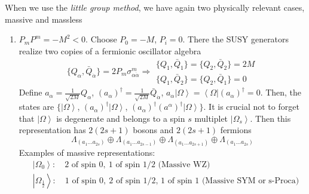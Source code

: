 \documentclass[a4paper,12pt]{article}
\numberwithin{equation}{section}
\numberwithin{exe}{section}
\newcommand{\Qb}{{\bar Q}}
\newcommand{\vac}{{\left|\Omega\right>}}
\renewcommand{\a}{{\alpha}}
\newcommand{\ad}{{\dot\alpha}}
\renewcommand{\L}{{\Lambda}}
\newcommand{\s}{{\sigma}}
\begin{document}
When we use the {\it little group method}, we have again two physically relevant cases, massive and massless
	\begin{enumerate}
	\item $P_m P^m = -M^2 <0$. Choose $P_0 = -M$, $P_i=0$. There the SUSY generators realize two copies of a fermionic oscillator algebra
		\begin{equation}
		\{Q_\a, \Qb_\ad\} = 2P_m \s^m_{\a\ad} \Rightarrow
			\begin{array}{l}
			\{Q_1, \Qb_1\} = \{Q_2, \Qb_2\} = 2M \\
			\{Q_1, \Qb_2\} = \{Q_2, \Qb_1\} = 0
			\end{array}
		\end{equation}
	Define $a_\a = \frac{1}{\sqrt{2M}}Q_\a$, $(a_\a)^\dagger = \frac{1}{\sqrt{2M}}\Qb_\ad$, $a_\a\vac = \left<\Omega\right|(a_\a)^\dagger=0$. Then, the states are $\{\vac$, $(a_\a)^\dagger\vac$, $(a_\a)^\dagger(a^\a)^\dagger\vac\}$. It is crucial not to forget that $\vac$ is degenerate and belongs to a spin $s$ multiplet $\left|\Omega_s\right>$.  Then this representation has $2(2s+1)$ bosons and $2(2s+1)$ fermions
		\begin{equation}
		\L_{(a_1\ldots a_{2s})}\oplus \L_{(a_1\ldots a_{2s-1})}\oplus\L_{(a_1\ldots a_{2s+1})}\oplus\L_{(a_1\ldots a_{2s})}
		\end{equation}
		Examples of massive representations:
		\begin{equation}
			\begin{aligned}
			& \left|\Omega_0\right>:\quad 2\text{ of spin }0,\ 1\text{ of spin 1/2 (Massive WZ)} \\
			& \left|\Omega_{\frac12}\right>:\quad 1\text{ of spin }0,\ 2\text{ of spin 1/2, 1 of spin 1 (Massive SYM or s-Proca)}
			\end{aligned}
		\end{equation}
	

\end{enumerate}
\end{document}
